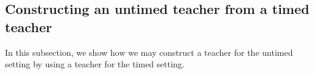 %

\subsection{Constructing an untimed teacher from a timed teacher}
In this subsection, we show how we may construct a teacher for the untimed setting by using a teacher for the timed setting.

